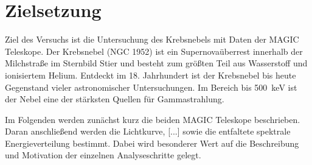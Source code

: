 \section{Zielsetzung}
\label{sec:zielsetzung}

Ziel des Versuchs ist die Untersuchung des Krebsnebels mit Daten der MAGIC
Teleskope. Der Krebsnebel (NGC 1952) ist ein Supernovaüberrest innerhalb der
Milchstraße im Sternbild Stier und besteht zum größten Teil aus Wasserstoff und
ionisiertem Helium. Entdeckt im 18. Jahrhundert ist der Krebsnebel bis heute
Gegenstand vieler astronomischer Untersuchungen. Im Bereich bis
\SI{500}{\kilo\electronvolt} ist der Nebel eine der stärksten Quellen für
Gammastrahlung.

Im Folgenden werden zunächst kurz die beiden MAGIC Teleskope beschrieben. Daran
anschließend werden die Lichtkurve, [...] sowie die entfaltete spektrale
Energieverteilung bestimmt. Dabei wird besonderer Wert auf die Beschreibung und
Motivation der einzelnen Analyseschritte gelegt.
